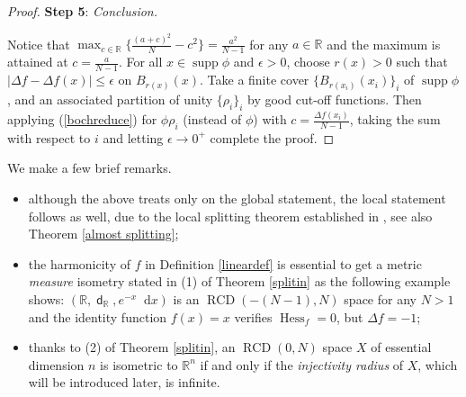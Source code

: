 \documentclass[11pt,reqno]{amsart}
\theoremstyle{definition}
\numberwithin{equation}{section}
\newcommand{\di}{\mathop{}\!\mathrm{d}}
\DeclareMathOperator{\dist}{\mathsf{d}}
\DeclareMathOperator{\Hess}{Hess}
\DeclareMathOperator{\RCD}{RCD}
\DeclareMathOperator{\supp}{supp}
\begin{document}
\begin{proof}
\smallskip

\textbf{Step 5}: \textit{Conclusion.}

\smallskip

Notice that $\max_{c \in \mathbb{R}}\{\frac{(a+c)^2}{N}-c^2\}=\frac{a^2}{N-1}$ for any $a \in \mathbb{R}$ and the maximum is attained at $c=\frac{a}{N-1}$.
For all $x \in \supp \phi$ and $\epsilon>0$, choose $r(x)>0$ such that $|\Delta f-\Delta f(x)| \le \epsilon$ on $B_{r(x)}(x)$. Take a finite cover $\{B_{r(x_i)}(x_i)\}_i$ of $\supp \phi$, and an associated partition of unity $\{\rho_i\}_i$ by good cut-off functions. Then applying (\ref{bochreduce}) for $\phi \rho_i$ (instead of $\phi$) with $c=\frac{\Delta f(x_i)}{N-1}$, taking the sum with respect to $i$ and letting $\epsilon \to 0^+$ complete the proof.
\end{proof}
We make a few brief remarks. \begin{itemize}
    \item although the above treats only on the global statement, the local statement follows as well, due to the local splitting theorem established in \cite{BNS}, see also Theorem \ref{almost splitting};
    \item the harmonicity of $f$ in Definition \ref{lineardef} is essential to get a metric \textit{measure} isometry stated in (1) of Theorem \ref{splitin} as the following example shows: $(\mathbb{R}, \dist_{\mathbb{R}}, e^{-x}\di x)$ is an $\RCD(-(N-1), N)$ space for any $N >1$ and the identity function $f(x)=x$ verifies $\Hess_f=0$, but $\Delta f=-1$;
    \item thanks to (2) of Theorem \ref{splitin}, an $\RCD(0, N)$ space $X$ of essential dimension $n$ is isometric to $\mathbb{R}^n$ if and only if the \textit{injectivity radius} of $X$, which will be introduced later, is infinite.
\end{itemize}
\end{document}
